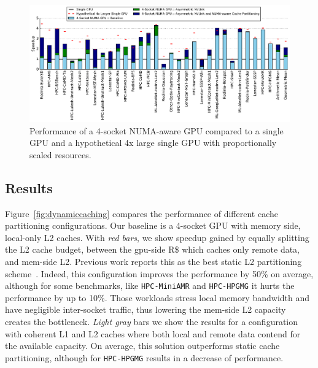 \begin{figure}[tp]
    \centering
    \includegraphics[width=1.0\textwidth]{figures/plot_final_speedup_WB_nvlink_first.pdf}
    \caption{Performance of a 4-socket NUMA-aware GPU compared to a single GPU and a hypothetical 4x large single GPU with proportionally scaled resources.}
    \label{fig:combined}
    \vspace{-.2in}
\end{figure}

\subsection{Results}

Figure~\ref{fig:dynamiccaching} compares the performance of different cache 
partitioning configurations. Our baseline is a 4-socket GPU with memory side, 
local-only L2 caches. With \emph{red bars}, we show speedup gained by equally 
splitting the L2 cache budget, between the gpu-side R\$ which caches only 
remote data, and mem-side L2. Previous work reports this as the best static 
L2 partitioning scheme~\cite{Arunkumar2017}. Indeed, this configuration 
improves the performance by 50\% on average, although for some benchmarks, 
like \texttt{HPC-MiniAMR} and \texttt{HPC-HPGMG} it hurts the performance by 
up to 10\%. Those workloads stress local memory bandwidth and have negligible 
inter-socket traffic, thus lowering the mem-side L2 capacity creates the 
bottleneck. \emph{Light gray} bars we show the results for a configuration with 
coherent L1 and L2 caches where both local and remote data contend for the 
available capacity. On average, this solution outperforms static cache 
partitioning, although for \texttt{HPC-HPGMG} results in a decrease of 
performance.

